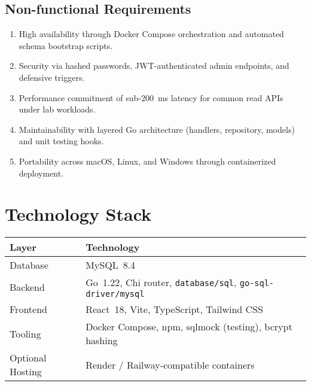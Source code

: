 \documentclass[12pt]{article}
\begin{document}
\subsection{Non-functional Requirements}
\begin{enumerate}[label=N\arabic*]
  \item High availability through Docker Compose orchestration and automated schema bootstrap scripts.
  \item Security via hashed passwords, JWT-authenticated admin endpoints, and defensive triggers.
  \item Performance commitment of sub-200~ms latency for common read APIs under lab workloads.
  \item Maintainability with layered Go architecture (handlers, repository, models) and unit testing hooks.
  \item Portability across macOS, Linux, and Windows through containerized deployment.
\end{enumerate}

\section{Technology Stack}
\begin{longtable}{@{}L{0.32\textwidth}L{0.6\textwidth}@{}}
\toprule
\textbf{Layer} & \textbf{Technology} \\
\midrule
Database & MySQL~8.4 \\
Backend & Go~1.22, Chi router, \texttt{database/sql}, \texttt{go-sql-driver/mysql} \\
Frontend & React~18, Vite, TypeScript, Tailwind CSS \\
Tooling & Docker Compose, npm, sqlmock (testing), bcrypt hashing \\
Optional Hosting & Render / Railway-compatible containers \\
\bottomrule
\end{longtable}
\end{document}

